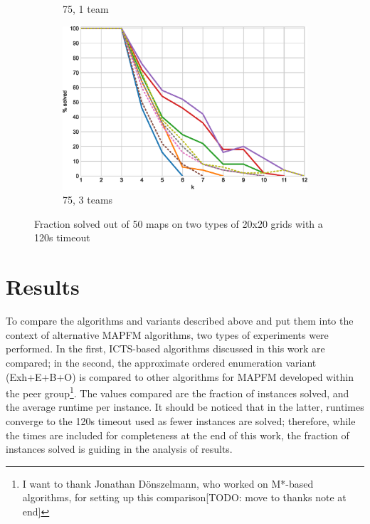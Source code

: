 \documentclass[english,10pt]{article}
\begin{document}
\begin{figure}[t]
\begin{subfigure}{0.44\textwidth}
		\caption{75, 1 team}
		\label{fig:75-1-p}
	\end{subfigure}
	\begin{subfigure}{0.44\textwidth}
		\centering
		\includegraphics[width=\linewidth]{img/results/relative-comparison/75-3-p}
		\caption{75, 3 teams}
		\label{fig:75-3-p}
	\end{subfigure}
	\caption{Fraction solved out of 50 maps on two types of 20x20 grids with a 120s timeout}
	\label{fig:probs}
	\end{figure}

\restoregeometry

	\section{Results}
	\label{experiments}
	To compare the algorithms and variants described above and put them into the context of alternative MAPFM algorithms, two types of experiments were performed. In the first, ICTS-based algorithms discussed in this work are compared; in the second, the approximate ordered enumeration variant (Exh+E+B+O) is compared to other algorithms for MAPFM developed within the peer group\footnote{I want to thank Jonathan Dönszelmann, who worked on M*-based algorithms, for setting up this comparison[TODO: move to thanks note at end]}. The values compared are the fraction of instances solved, and the average runtime per instance. It should be noticed that in the latter, runtimes converge to the 120s timeout used as fewer instances are solved; therefore, while the times are included for completeness at the end of this work, the fraction of instances solved is guiding in the analysis of results.
\end{document}
